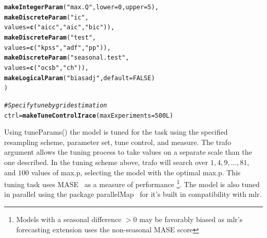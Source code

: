 \documentclass[12pt]{article}\usepackage[]{graphicx}\usepackage[]{color}
\makeatletter
\newcommand{\hlnum}[1]{\textcolor[rgb]{0.686,0.059,0.569}{#1}}%
\newcommand{\hlstr}[1]{\textcolor[rgb]{0.192,0.494,0.8}{#1}}%
\newcommand{\hlcom}[1]{\textcolor[rgb]{0.678,0.584,0.686}{\textit{#1}}}%
\newcommand{\hlstd}[1]{\textcolor[rgb]{0.345,0.345,0.345}{#1}}%
\newcommand{\hlkwb}[1]{\textcolor[rgb]{0.69,0.353,0.396}{#1}}%
\newcommand{\hlkwc}[1]{\textcolor[rgb]{0.333,0.667,0.333}{#1}}%
\newcommand{\hlkwd}[1]{\textcolor[rgb]{0.737,0.353,0.396}{\textbf{#1}}}%
\newenvironment{kframe}{%
 \def\at@end@of@kframe{}%
 \ifinner\ifhmode%
  \def\at@end@of@kframe{\end{minipage}}%
  \begin{minipage}{\columnwidth}%
 \fi\fi%
 \def\FrameCommand##1{\hskip\@totalleftmargin \hskip-\fboxsep
 \colorbox{shadecolor}{##1}\hskip-\fboxsep
     \hskip-\linewidth \hskip-\@totalleftmargin \hskip\columnwidth}%
 \MakeFramed {\advance\hsize-\width
   \@totalleftmargin\z@ \linewidth\hsize
   \@setminipage}}%
 {\par\unskip\endMakeFramed%
 \at@end@of@kframe}
\newenvironment{knitrout}{}{} %
\theoremstyle{definition}
\newcommand\code{\@codex}
\def\@codex#1{{\normalfont\ttfamily\hyphenchar\font=-1 #1}}
\newcommand{\pkg}[1]{{\fontseries{b}\selectfont #1}}
\makeatother
\begin{document}
\begin{knitrout}
\begin{kframe}
\begin{alltt}
           \hlkwd{makeIntegerParam}\hlstd{(}\hlstr{"max.Q"}\hlstd{,} \hlkwc{lower} \hlstd{=} \hlnum{0}\hlstd{,} \hlkwc{upper} \hlstd{=} \hlnum{5}\hlstd{),}
           \hlkwd{makeDiscreteParam}\hlstd{(}\hlstr{"ic"}\hlstd{,}
                             \hlkwc{values} \hlstd{=} \hlkwd{c}\hlstd{(}\hlstr{"aicc"}\hlstd{,}\hlstr{"aic"}\hlstd{,}\hlstr{"bic"}\hlstd{)),}
           \hlkwd{makeDiscreteParam}\hlstd{(}\hlstr{"test"}\hlstd{,}
                             \hlkwc{values} \hlstd{=} \hlkwd{c}\hlstd{(}\hlstr{"kpss"}\hlstd{,}\hlstr{"adf"}\hlstd{,}\hlstr{"pp"}\hlstd{)),}
           \hlkwd{makeDiscreteParam}\hlstd{(}\hlstr{"seasonal.test"}\hlstd{,}
                            \hlkwc{values} \hlstd{=} \hlkwd{c}\hlstd{(}\hlstr{"ocsb"}\hlstd{,} \hlstr{"ch"}\hlstd{)),}
          \hlkwd{makeLogicalParam}\hlstd{(}\hlstr{"biasadj"}\hlstd{,} \hlkwc{default} \hlstd{=} \hlnum{FALSE}\hlstd{)}
        \hlstd{)}

\hlcom{#Specify tune by grid estimation}
\hlstd{ctrl} \hlkwb{=} \hlkwd{makeTuneControlIrace}\hlstd{(}\hlkwc{maxExperiments} \hlstd{=} \hlnum{500L}\hlstd{)}
\end{alltt}
\end{kframe}
\end{knitrout}
\doublespacing

Using \code{tuneParams()} the model is tuned for the task using the specified resampling scheme, parameter set, tune control, and measure. The \code{trafo} argument allows the tuning process to take values on a separate scale than the one described. In the tuning scheme above, trafo will search over $1, 4, 9, ..., 81$, and $100$ values of \code{max.p}, selecting the model with the optimal \code{max.p}. This tuning task uses MASE~\cite{Hyndman2006} as a measure of performance \footnote{Models with a seasonal difference $> 0$ may be favorably biased as \pkg{mlr}'s forecasting extension uses the non-seasonal MASE score}. The model is also tuned in parallel using the package \pkg{parallelMap}~\cite{parallel} for it's built in compatibility with \pkg{mlr}.
\end{document}
